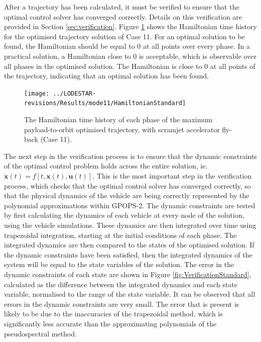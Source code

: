 After a trajectory has been calculated, it must be verified to ensure that the optimal control solver has converged correctly. Details on this verification are provided in Section \ref{sec:verification}. Figure \ref{fig:HamiltonianStandard} shows the Hamiltonian time history for the optimised trajectory solution of Case 11. For an optimal solution to be found, the Hamiltonian should be equal to 0 at all points over every phase. In a practical solution, a Hamiltonian close to 0 is acceptable, which is observable over all phases in the optimised solution. The Hamiltonian is close to 0 at all points of the trajectory, indicating that an optimal solution has been found. 
\begin{figure}[ht]
	\centering
	\texttt{[image: ../LODESTAR-revisions/Results/mode11/HamiltonianStandard]}
	\caption{The Hamiltonian time history of each phase of the maximum payload-to-orbit optimised trajectory, with scramjet accelerator fly-back (Case 11).}
	\label{fig:HamiltonianStandard}
\end{figure}

The next step in the verification process is to ensure that the dynamic constraints of the optimal control problem holds across the entire solution, ie. $\dot{\textbf{x}}(t) = f[t,\textbf{x}(t),\textbf{u}(t)]$. This is the most important step in the verification process, which checks that the optimal control solver has converged correctly, so that the physical dynamics of the vehicle are being correctly represented by the polynomial approximations within GPOPS-2. The dynamic constraints are tested by first calculating the dynamics of each vehicle at every node of the solution, using the vehicle simulations. These dynamics are then integrated over time using trapezoidal integration, starting at the initial conditions of each phase. The integrated dynamics are then compared to the states of the optimised solution. If the dynamic constraints have been satisfied, then the integrated dynamics of the system will be equal to the state variables of the solution. The error in the dynamic constraints of each state are shown in Figure \ref{fig:VerificationStandard}, calculated as the difference between the integrated dynamics and each state variable, normalised to the range of the state variable. 
It can be observed that all errors in the dynamic constraints are very small. The error that is present is likely to be due to the inaccuracies of the trapezoidal method, which is significantly less accurate than the approximating polynomials of the pseudospectral method. 



